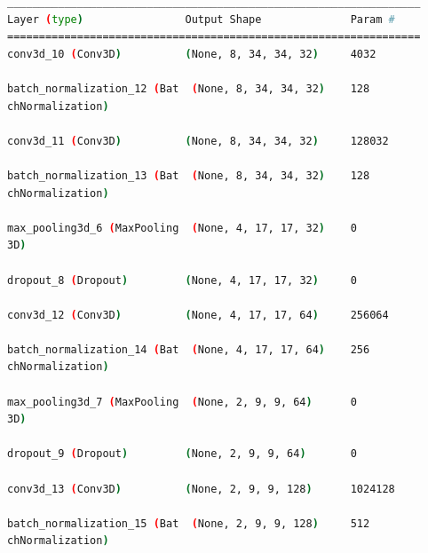 \begin{lstlisting}[language=Bash,caption={Overview of layers in 3D convolutional network},label={lst:3d_conv_layers},numbers=none,float=htb]
_________________________________________________________________
Layer (type)                Output Shape              Param #   
=================================================================
conv3d_10 (Conv3D)          (None, 8, 34, 34, 32)     4032      
                                                                
batch_normalization_12 (Bat  (None, 8, 34, 34, 32)    128       
chNormalization)                                                
                                                                
conv3d_11 (Conv3D)          (None, 8, 34, 34, 32)     128032    
                                                                
batch_normalization_13 (Bat  (None, 8, 34, 34, 32)    128       
chNormalization)                                                
                                                                
max_pooling3d_6 (MaxPooling  (None, 4, 17, 17, 32)    0         
3D)                                                             
                                                                
dropout_8 (Dropout)         (None, 4, 17, 17, 32)     0         
                                                                
conv3d_12 (Conv3D)          (None, 4, 17, 17, 64)     256064    
                                                                
batch_normalization_14 (Bat  (None, 4, 17, 17, 64)    256       
chNormalization)                                                
                                                                
max_pooling3d_7 (MaxPooling  (None, 2, 9, 9, 64)      0         
3D)                                                             
                                                                
dropout_9 (Dropout)         (None, 2, 9, 9, 64)       0         
                                                                
conv3d_13 (Conv3D)          (None, 2, 9, 9, 128)      1024128   
                                                                
batch_normalization_15 (Bat  (None, 2, 9, 9, 128)     512       
chNormalization)                                                
                                                                

\end{lstlisting}

